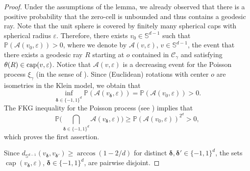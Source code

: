 \documentclass[12pt,a4paper]{article}
\newtheorem{lemma}[proposition]{Lemma}
\theoremstyle{definition}
\DeclareMathOperator{\capop}{cap}
\begin{document}
\begin{proof}
    Under the assumptions of the lemma, we already observed that there is a positive probability that the zero-cell is unbounded and thus contains a geodesic ray.
    Note that the unit sphere is covered by finitely many spherical caps with spherical radius $\varepsilon$. Therefore, there exists $v_0\in\mathbb S^{d-1}$ such that $\mathbb P(\mathcal A(v_0,\varepsilon))>0$, where we denote by $\mathcal A(v,\varepsilon)$, $v\in\mathbb S^{d-1}$, the event that there exists a geodesic ray $R$ starting at $o$ contained in $\mathcal C_\gamma$ and satisfying $\theta(R)\in{\rm cap}(v,\varepsilon)$. Notice that $\mathcal A(v,\varepsilon)$ is a decreasing event for the Poisson process $\xi_\gamma$ (in the sense of \cite[Section~20.3]{LP17}). Since (Euclidean) rotations with center $o$ are isometries in the Klein model, we obtain that 
    $$
    \inf_{\boldsymbol\delta\in\{-1,1\}^d}  \mathbb P(\mathcal A(v_{\boldsymbol\delta},\varepsilon)) = \mathbb P(\mathcal A(v_0,\varepsilon))>0.
    $$
    The FKG inequality for the Poisson process (see \cite[Theorem 20.4]{LP17}) implies that 
    $$
    \mathbb P\bigg(\bigcap_{\boldsymbol\delta \in \{-1,1\}^d}  \mathcal A(v_{\boldsymbol\delta},\varepsilon)\bigg)\ge \mathbb P(\mathcal A(v_0,\varepsilon))^{2^d}>0,  
    $$
    which proves the first assertion.
    
    Since $d_{\mathbb{S}^{d-1}}(v_{\boldsymbol\delta},v_{\boldsymbol\delta'}) \geq \arccos(1-2/d)$ for  distinct $\boldsymbol\delta,\boldsymbol\delta' \in \{-1,1\}^d$, the sets $\capop(v_{\boldsymbol\delta},\varepsilon)$, $\boldsymbol\delta \in \{-1,1\}^d$, are pairwise disjoint.
\end{proof}



\end{document}
